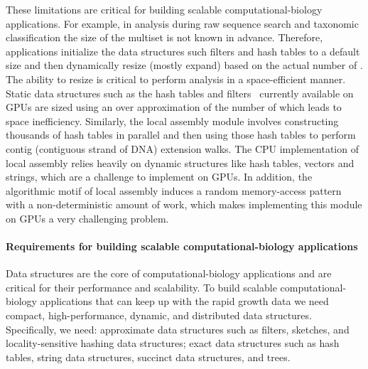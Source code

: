 These limitations are critical for building scalable computational-biology applications. For example, in \kmer analysis during raw sequence search and taxonomic classification the size of the \kmer multiset is not known in advance. Therefore, applications initialize the data structures such filters and hash tables to a default size and then dynamically resize (mostly expand) based on the actual number of \kmers. The ability to resize is critical to perform \kmer analysis in a space-efficient manner. Static data structures such as the hash tables and filters~\cite{GeilFO18} currently available on GPUs are sized using an over approximation of the number of \kmers which leads to space inefficiency.
Similarly, the local assembly module involves constructing thousands of hash tables in parallel and then using those hash tables to perform contig (contiguous strand of DNA) extension walks. The CPU implementation of local assembly relies heavily on dynamic
structures like hash tables, vectors and strings, which are a challenge to implement on GPUs. In addition, the algorithmic motif of local assembly induces a random memory-access pattern with a non-deterministic amount of work, which makes implementing this module on GPUs a very challenging problem.






\paragraph{Requirements for building scalable computational-biology applications}

Data structures are the core of computational-biology applications and are critical for their performance and scalability.
To build scalable computational-biology applications that can keep up with the rapid growth data we need compact, high-performance, dynamic, and distributed data structures. Specifically, we need: approximate data structures such as filters, sketches, and locality-sensitive hashing data structures; exact data structures such as hash tables, string data structures, succinct data structures, and trees.

